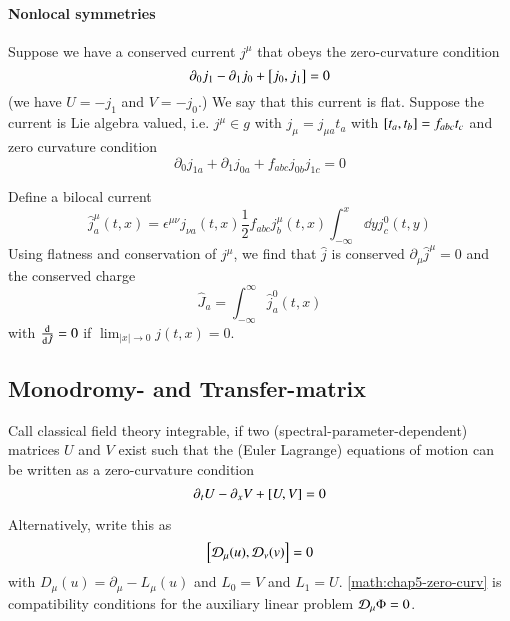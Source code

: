 \paragraph{Nonlocal symmetries}
Suppose we have a conserved current $j^\mu$ that obeys the zero-curvature condition
	\begin{equation}
		\partial_0 j_1 - \partial_1 j_0 + \comm{j_0}{j_1} = 0
		\label{math:5.2}
	\end{equation}
	(we have $U = -j_1$ and $V = -j_0$.) We say that this current is flat. Suppose the current is Lie algebra valued, i.e. $j^\mu \in g$ with $j_\mu = j_{\mu a} t_a$ with $\comm{t_a}{t_b} = f_{abc} t_c$ and zero curvature condition
	\begin{equation}
		\partial_0 j_{1a} + \partial_1 j_{0a} + f_{abc} j_{0b} j_{1c} = 0
	\end{equation}

Define a bilocal current
\begin{equation*}
	\hat{j}_a^\mu (t, x) = \epsilon^{\mu\nu} j_{\nu a} (t, x) \frac{1}{2} f_{abc} j_b^\mu (t, x) \int_{-\infty}^x \dd{y} j_c^0 (t, y)
\end{equation*}
Using flatness and conservation of $j^\mu$, we find that $\hat{j}$ is conserved $\partial_\mu \hat{j}^\mu = 0$ and the conserved charge 
\begin{equation*}
	\hat{J}_a = \int_{-\infty}^{\infty} \hat{j}_a^0 (t,x)	
\end{equation*}
with $\dv{\hat{J}}=0$ if $\lim_{|x|\rightarrow 0} j(t, x) =0$.

\subsection{Monodromy- and Transfer-matrix}
Call classical field theory integrable, if two (spectral-parameter-dependent) matrices $U$ and $V$ exist such that the (Euler Lagrange) equations of motion can be written as a zero-curvature condition
\begin{equation}
	\partial_t U - \partial_x V + \comm{U}{V} = 0
	\label{math:chap5-zero-curv}
\end{equation}

Alternatively, write this as 
\begin{equation*}
	\comm{\D_\mu (u)}{\D_\nu (v)} = 0
\end{equation*}
with $D_\mu (u) = \partial_\mu - L_\mu (u)$ and $L_0 = V$ and $L_1 = U$. \eqref{math:chap5-zero-curv} is compatibility conditions for the auxiliary linear problem $\mathcal{D}_\mu \Phi = 0$.

